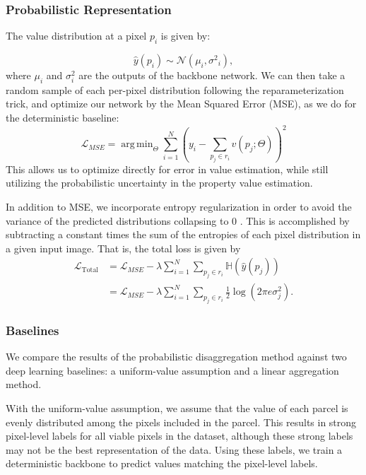 \documentclass[10pt,twocolumn,letterpaper]{article}
\DeclareMathOperator*{\argmin}{arg\,min}
\begin{document}
\subsubsection{Probabilistic Representation}
\label{sec:sampling}

The value distribution at a pixel $p_i$ is given by:

\begin{equation}
    \hat{y}(p_i) \sim \mathsf{\mathcal{N}}({{\mu}_i}, {\sigma^{2}}_i),
\end{equation}
where $\mu_i$ and $\sigma^{2}_i$ are the outputs of the backbone network.
We can then take a random sample of each per-pixel distribution following the reparameterization trick, and optimize our network by the Mean Squared Error (MSE), as we do for the deterministic baseline:
\begin{equation}
   \mathcal{L}_{MSE}=\argmin_\Theta \sum_{i=1}^{N}(y_i -\sum_{p_j\in r_i} v( p_j; \Theta) )^2
\end{equation}
This allows us to optimize directly for error in value estimation, while still utilizing the probabilistic uncertainty in the property value estimation.

In addition to MSE, we incorporate entropy regularization in order to avoid the variance of the predicted distributions collapsing to 0 \cite{Kingma2014AutoEncodingVB}. This is accomplished by subtracting a constant times the sum of the entropies of each pixel distribution in a given input image. That is, the total loss is given by
\begin{align}
    \mathcal{L}_{\mathrm{Total}} &= \mathcal{L}_{MSE} - \lambda\sum_{i=1}^N \sum_{p_j \in r_i} \mathbb{H}\left(\hat{y}(p_j)\right) \\
    &= \mathcal{L}_{MSE} - \lambda \sum_{i=1}^N \sum_{p_j \in r_i} \frac{1}{2} \log\left(2\pi e \sigma_j^2\right).
\end{align}

\subsubsection{Baselines}
\label{sec:baselines}
We compare the results of the probabilistic disaggregation method against two deep learning baselines: a uniform-value assumption and a linear aggregation method.

With the uniform-value assumption, we assume that the value of each parcel is evenly distributed among the pixels included in the parcel. This results in strong pixel-level labels for all viable pixels in the dataset, although these strong labels may not be the best representation of the data. Using these labels, we train a deterministic backbone to predict values matching the pixel-level labels.
\end{document}
